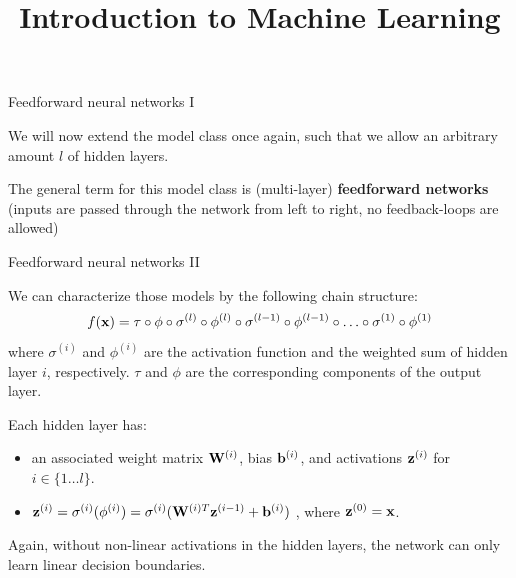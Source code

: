 \documentclass[11pt,compress,t,notes=noshow, xcolor=table]{beamer}
\title{Introduction to Machine Learning}
\begin{document}



\begin{framei}[sep=L]{Feedforward neural networks I}
\item We will now extend the model class once again, such that we allow an arbitrary amount $l$ of hidden layers.
\vfill
\item The general term for this model class is (multi-layer) \textbf{feedforward networks} (inputs are passed through the network from left to right, no feedback-loops are allowed)
\end{framei}

\begin{framei}{Feedforward neural networks II}
\item We can characterize those models by the following chain structure: $$f(\mathbf{x}) = \tau \circ \phi \circ \sigma^{(l)} \circ \phi^{(l)} \circ \sigma^{(l-1)} \circ \phi^{(l-1)} \circ \ldots \circ \sigma^{(1)} \circ \phi^{(1)}$$ where $\sigma^{(i)}$ and $\phi^{(i)}$ are the activation function and the weighted sum of hidden layer $i$, respectively. $\tau$ and $\phi$ are the corresponding components of the output layer.
\vfill
\item Each hidden layer has: 
\begin{itemize}
\vfill
\item an associated weight matrix $\mathbf{W}^{(i)}$, bias $\mathbf{b}^{(i)}$, and activations $\mathbf{z}^{(i)}$ for $i \in \{ 1 \ldots l\}$.
\vfill
\item $\mathbf{z}^{(i)} = \sigma^{(i)}(\phi^{(i)}) = \sigma^{(i)}(\mathbf{W}^{(i)T}\mathbf{z}^{(i - 1)} + \mathbf{b}^{(i)})$ , where $\mathbf{z}^{(0)} = \mathbf{x}$.
\end{itemize}
\vfill
\item Again, without non-linear activations in the hidden layers, the network can only learn linear decision boundaries.
\end{framei}
\end{document}
